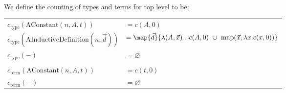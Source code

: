 \begin{definition}
  We define the counting of types and terms for top level \coqobjs to be:

  \vspace{1em}
  \begin{tabular}{ll}
    $c_{\text{type}}(\text{AConstant}(n, A, t))$ & $= c(A, 0)$ \\
    $c_{\text{type}}(\text{AInductiveDefinition}(n, \vec{d}))$ & $= \map{\vec{d}}{ \lambda (A, \vec{x}) ~.~ c(A, 0) ~\cup~ \text{map}(\vec{x}, \lambda x . c(x, 0)) } $\\
    $c_{\text{type}}(-)$ & $= \varnothing$ \\
    & \\
    $c_{\text{term}}(\text{AConstant}(n, A, t))$ & $= c(t, 0)$ \\
    $c_{\text{term}}(-)$ & $= \varnothing$ \\
  \end{tabular}
\end{definition}

\begin{definition}

\end{definition}
